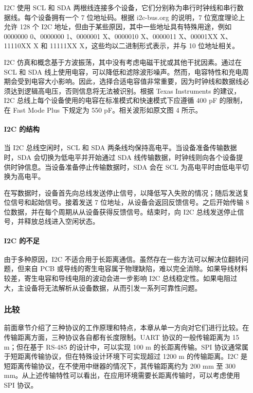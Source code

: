 \documentclass[12pt,a4paper]{article}
\numberwithin{equation}{section}
\begin{document}
I2C 使用 SCL 和 SDA 两根线连接多个设备，它们分别称为串行时钟线和串行数据线。每个设备拥有一个 7 位地址码。根据 i2c-bus.org 的说明，7 位宽度理论上允许 128 个 I2C 地址，但由于某些原因，其中一些地址具有特殊用途，例如 0000000 0、0000000 1、0000001 X、0000010 X、0000011 X、00001XX X、11110XX X 和 11111XX X，这些均以二进制形式表示，并与 10 位地址相关。

I2C 仿真和概念基于方波振荡，其中没有考虑电磁干扰或其他干扰因素。通过在 SCL 和 SDA 线上使用电容，可以降低和滤除波形噪声。然而，电容特性和充电周期会受到电容大小影响。因此，选择合适电容值非常重要，因为时钟线和数据线必须达到逻辑高电压，否则信息将无法被识别。根据 Texas Instruments 的建议，I2C 总线上每个设备使用的电容在标准模式和快速模式下应遵循 400 pF 的限制，在 Fast Mode Plus 下规定为 550 pF。相关波形如原文图 4 所示。

\paragraph{I2C 的结构}

当 I2C 总线空闲时，SCL 和 SDA 两条线均保持高电平。当设备准备传输数据时，SDA 会切换为低电平并开始通过 SDA 线传输数据，时钟线则向各个设备提供时钟信息。当设备准备停止传输数据时，SDA 会在 SCL 为高电平时由低电平切换为高电平。

在写数据时，设备首先向总线发送停止信号，以降低写入失败的情况；随后发送复位信号和起始信号。接着发送 7 位地址，从设备会返回反馈信号。之后开始传输 8 位数据，并在每个周期从从设备获得反馈信号。结束时，向 I2C 总线发送停止信号，并释放总线进入空闲状态。

\paragraph{I2C 的不足}

由于多种原因，I2C 不适合用于长距离通信。虽然存在一些方法可以解决位翻转问题，但来自 PCB 或导线的寄生电容属于物理缺陷，难以完全消除。如果导线材料较差，寄生电容和导线电阻的波动会进一步影响 I2C 总线稳定性。如果电阻过大，主设备将无法解析从设备数据，从而引发一系列可靠性问题。

\subsubsection*{比较}

前面章节介绍了三种协议的工作原理和特点，本章从单一方向对它们进行比较。在传输距离方面，三种协议各自都有长度限制。UART 协议的一般传输距离为 15 m；但在基于 RS-485 的设计中，可以实现 100 m 的长距离传输。SPI 协议通常属于短距离传输协议，但在特殊设计环境下可实现超过 1200 m 的传输距离。I2C 是短距离传输协议，在不使用中继器的情况下，其传输距离约为 200 mm 至 300 mm。从上述传输特性可以看出，在应用环境需要长距离传输时，可以考虑使用 SPI 协议。
\end{document}
